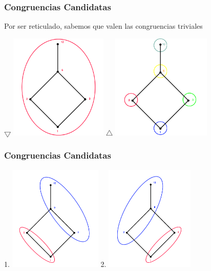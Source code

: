 \documentclass{beamer}
\begin{document}
\begin{frame}
\frametitle{Congruencias Candidatas}
Por ser reticulado, sabemos que valen las congruencias triviales
\begin{center}


$\bigtriangledown$ \includegraphics[height=5cm]{trivial_1}
$\bigtriangleup$ \includegraphics[height=5cm]{trivial_2}
\end{center}
\end{frame}

\begin{frame}
\frametitle{Congruencias Candidatas}
\begin{center}
1. \includegraphics[height=5cm]{congruencia_1}
2. \includegraphics[height=5cm]{congruencia_2}
\end{center}
\end{frame}
\end{document}

